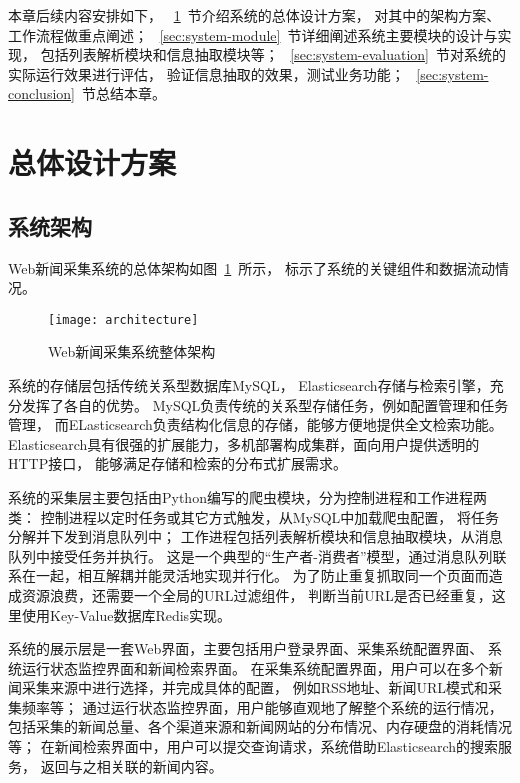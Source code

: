 本章后续内容安排如下，
~\ref{sec:system-architecture}~节介绍系统的总体设计方案，
对其中的架构方案、工作流程做重点阐述；
~\ref{sec:system-module}~节详细阐述系统主要模块的设计与实现，
包括列表解析模块和信息抽取模块等；
~\ref{sec:system-evaluation}~节对系统的实际运行效果进行评估，
验证信息抽取的效果，测试业务功能；
~\ref{sec:system-conclusion}~节总结本章。

\section{总体设计方案}
\label{sec:system-architecture}

\subsection{系统架构}
Web新闻采集系统的总体架构如图~\ref{fig:architecture}~所示，
标示了系统的关键组件和数据流动情况。

\begin{figure}[htbp]
\centering
\texttt{[image: architecture]}
\caption{Web新闻采集系统整体架构}
\label{fig:architecture}
\end{figure}

系统的存储层包括传统关系型数据库MySQL，
Elasticsearch存储与检索引擎，充分发挥了各自的优势。
MySQL负责传统的关系型存储任务，例如配置管理和任务管理，
而ELasticsearch负责结构化信息的存储，能够方便地提供全文检索功能。
Elasticsearch具有很强的扩展能力，多机部署构成集群，面向用户提供透明的HTTP接口，
能够满足存储和检索的分布式扩展需求。

系统的采集层主要包括由Python编写的爬虫模块，分为控制进程和工作进程两类：
控制进程以定时任务或其它方式触发，从MySQL中加载爬虫配置，
将任务分解并下发到消息队列中；
工作进程包括列表解析模块和信息抽取模块，从消息队列中接受任务并执行。
这是一个典型的“生产者-消费者”模型，通过消息队列联系在一起，相互解耦并能灵活地实现并行化。
为了防止重复抓取同一个页面而造成资源浪费，还需要一个全局的URL过滤组件，
判断当前URL是否已经重复，这里使用Key-Value数据库Redis实现。

系统的展示层是一套Web界面，主要包括用户登录界面、采集系统配置界面、
系统运行状态监控界面和新闻检索界面。
在采集系统配置界面，用户可以在多个新闻采集来源中进行选择，并完成具体的配置，
例如RSS地址、新闻URL模式和采集频率等；
通过运行状态监控界面，用户能够直观地了解整个系统的运行情况，
包括采集的新闻总量、各个渠道来源和新闻网站的分布情况、内存硬盘的消耗情况等；
在新闻检索界面中，用户可以提交查询请求，系统借助Elasticsearch的搜索服务，
返回与之相关联的新闻内容。

